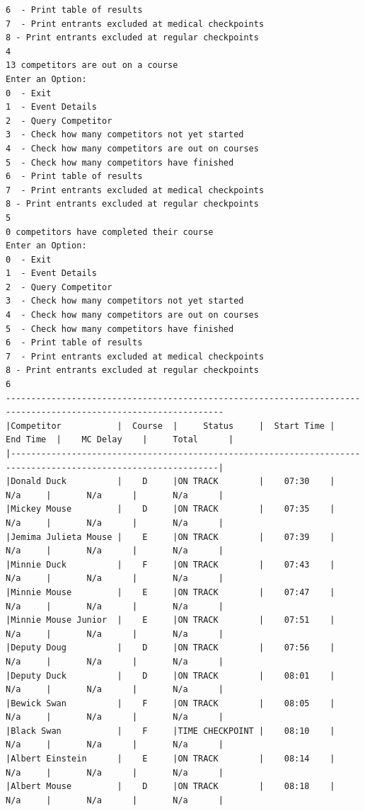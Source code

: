 \documentclass{article}
\begin{document}
\begin{center}
\begin{lstlisting}[showstringspaces=false, caption={Output of an example run of the C program}]
6  - Print table of results
7  - Print entrants excluded at medical checkpoints
8 - Print entrants excluded at regular checkpoints
4
13 competitors are out on a course
Enter an Option:
0  - Exit
1  - Event Details
2  - Query Competitor
3  - Check how many competitors not yet started
4  - Check how many competitors are out on courses
5  - Check how many competitors have finished
6  - Print table of results
7  - Print entrants excluded at medical checkpoints
8 - Print entrants excluded at regular checkpoints
5
0 competitors have completed their course
Enter an Option:
0  - Exit
1  - Event Details
2  - Query Competitor
3  - Check how many competitors not yet started
4  - Check how many competitors are out on courses
5  - Check how many competitors have finished
6  - Print table of results
7  - Print entrants excluded at medical checkpoints
8 - Print entrants excluded at regular checkpoints
6
-----------------------------------------------------------------------------------------------------------------
|Competitor           |  Course  |     Status     |  Start Time |   End Time  |    MC Delay    |     Total      |
|---------------------------------------------------------------------------------------------------------------|
|Donald Duck          |    D     |ON TRACK        |    07:30    |     N/a     |       N/a      |       N/a      |
|Mickey Mouse         |    D     |ON TRACK        |    07:35    |     N/a     |       N/a      |       N/a      |
|Jemima Julieta Mouse |    E     |ON TRACK        |    07:39    |     N/a     |       N/a      |       N/a      |
|Minnie Duck          |    F     |ON TRACK        |    07:43    |     N/a     |       N/a      |       N/a      |
|Minnie Mouse         |    E     |ON TRACK        |    07:47    |     N/a     |       N/a      |       N/a      |
|Minnie Mouse Junior  |    E     |ON TRACK        |    07:51    |     N/a     |       N/a      |       N/a      |
|Deputy Doug          |    D     |ON TRACK        |    07:56    |     N/a     |       N/a      |       N/a      |
|Deputy Duck          |    D     |ON TRACK        |    08:01    |     N/a     |       N/a      |       N/a      |
|Bewick Swan          |    F     |ON TRACK        |    08:05    |     N/a     |       N/a      |       N/a      |
|Black Swan           |    F     |TIME CHECKPOINT |    08:10    |     N/a     |       N/a      |       N/a      |
|Albert Einstein      |    E     |ON TRACK        |    08:14    |     N/a     |       N/a      |       N/a      |
|Albert Mouse         |    D     |ON TRACK        |    08:18    |     N/a     |       N/a      |       N/a      |

\end{lstlisting}
\end{center}
\end{document}
